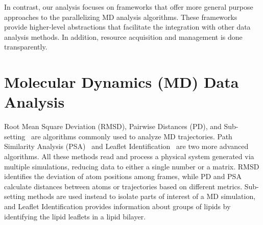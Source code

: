 In contrast, our analysis focuses on frameworks that offer more general
purpose approaches to the parallelizing MD analysis algorithms.
These frameworks provide higher-level abstractions that facilitate the
integration with other data analysis methods. In addition, resource acquisition
and management is done transparently.

\section{Molecular Dynamics (MD) Data Analysis}
\label{sec:md_use_cases}

Root Mean Square Deviation (RMSD), Pairwise Distances (PD), and
Sub-setting~\cite{mura2014biomolecules} are algorithms commonly used to analyze
MD trajectories. Path Similarity Analysis (PSA)~\cite{seyler2015path} and
Leaflet Identification~\cite{michaud2011mdanalysis} are two more advanced
algorithms. All these methods read and process a physical system generated via
multiple simulations, reducing data to either a single number or a matrix. RMSD
identifies the deviation of atom positions among frames, while PD and PSA
calculate distances between atoms or trajectories based on different metrics.
Sub-setting methods are used instead to isolate parts of interest of a MD
simulation, and Leaflet Identification provides information about groups of
lipids by identifying the lipid leaflets in a lipid bilayer.


